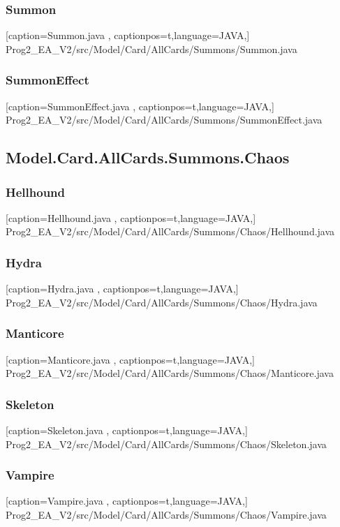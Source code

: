 \documentclass[a4paper,12pt]{scrartcl}
\begin{document}
	\subsubsection{Summon}
	
	[caption={Summon.java}
	\label{lst:javaclass},
	captionpos=t,language=JAVA,]
	{Prog2_EA_V2/src/Model/Card/AllCards/Summons/Summon.java}
	\subsubsection{SummonEffect}
	
	[caption={SummonEffect.java}
	\label{lst:javaclass},
	captionpos=t,language=JAVA,]
	{Prog2_EA_V2/src/Model/Card/AllCards/Summons/SummonEffect.java}
	\subsection{Model.Card.AllCards.Summons.Chaos}
	\subsubsection{Hellhound}
	
	[caption={Hellhound.java}
	\label{lst:javaclass},
	captionpos=t,language=JAVA,]
	{Prog2_EA_V2/src/Model/Card/AllCards/Summons/Chaos/Hellhound.java}
	\subsubsection{Hydra}
	
	[caption={Hydra.java}
	\label{lst:javaclass},
	captionpos=t,language=JAVA,]
	{Prog2_EA_V2/src/Model/Card/AllCards/Summons/Chaos/Hydra.java}
	\subsubsection{Manticore}
	
	[caption={Manticore.java}
	\label{lst:javaclass},
	captionpos=t,language=JAVA,]
	{Prog2_EA_V2/src/Model/Card/AllCards/Summons/Chaos/Manticore.java}
	\subsubsection{Skeleton}
	
	[caption={Skeleton.java}
	\label{lst:javaclass},
	captionpos=t,language=JAVA,]
	{Prog2_EA_V2/src/Model/Card/AllCards/Summons/Chaos/Skeleton.java}
	\subsubsection{Vampire}
	
	[caption={Vampire.java}
	\label{lst:javaclass},
	captionpos=t,language=JAVA,]
	{Prog2_EA_V2/src/Model/Card/AllCards/Summons/Chaos/Vampire.java}
\end{document}
